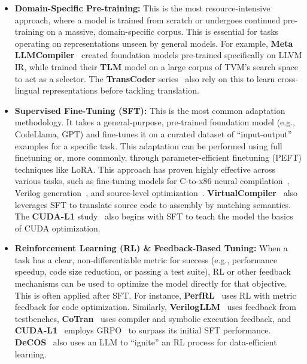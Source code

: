 \documentclass[pdflatex,sn-mathphys-ay,twocolumn, a4paper]{sn-jnl}%
\theoremstyle{thmstyleone}%
\theoremstyle{thmstyletwo}%
\theoremstyle{thmstylethree}%
\begin{document}
\begin{itemize}
    \item \textbf{Domain-Specific Pre-training:} This is the most resource-intensive approach, where a model is trained from scratch or undergoes continued pre-training on a massive, domain-specific corpus. This is essential for tasks operating on representations unseen by general models. For example, \textbf{Meta LLMCompiler}~\citep{metallmcompiler-cc25} created foundation models pre-trained specifically on LLVM IR, while \citet{167_zhai2024_osdi} trained their \textbf{TLM} model on a large corpus of TVM's search space to act as a selector. The \textbf{TransCoder} series~\citep{177_transcoder, 176_dobf, 175_transcoderst,  154_transcoderir2023_iclr} also rely on this to learn cross-lingual representations before tackling translation.

    \item \textbf{Supervised Fine-Tuning (SFT):} 
    This is the most common adaptation methodology. It takes a general-purpose, pre-trained foundation model (e.g., CodeLlama, GPT) and fine-tunes it on a curated dataset of ``input-output'' examples for a specific task. This adaptation can be performed using full finetuning or, more commonly, through parameter-efficient finetuning (PEFT) techniques like LoRA. This approach has proven highly effective across various tasks, such as fine-tuning models for C-to-x86 neural compilation~\citep{70_c-x86-emnlp24}, Verilog generation~\citep{104_verigen2024}, and source-level optimization~\citep{63_xu2025efficient}. \textbf{VirtualCompiler}~\citep{71_gao-etal-2024-virtual} also leverages SFT to translate source code to assembly by matching semantics. The \textbf{CUDA-L1} study~\citep{cudal1_2025_arxiv} also begins with SFT to teach the model the basics of CUDA optimization.
    
    \item \textbf{Reinforcement Learning (RL) \& Feedback-Based Tuning:} When a task has a clear, non-differentiable metric for success (e.g., performance speedup, code size reduction, or passing a test suite), RL or other feedback mechanisms can be used to optimize the model directly for that objective. This is often applied after SFT. For instance, \textbf{PerfRL}~\citep{134_duan2025perfrlsmalllanguagemodel} uses RL with metric feedback for code optimization. Similarly, \textbf{VerilogLLM}~\citep{64_wang2025insights} uses feedback from testbenches, \textbf{CoTran}~\citep{38_jana2024cotran} uses compiler and symbolic execution feedback, and \textbf{CUDA-L1}~\citep{cudal1_2025_arxiv} employs GRPO~\citep{grpo_2024_arxiv} to surpass its initial SFT performance. \textbf{DeCOS}~\citep{51_decos2025_ics} also uses an LLM to ``ignite'' an RL process for data-efficient learning.
\end{itemize}
\end{document}
